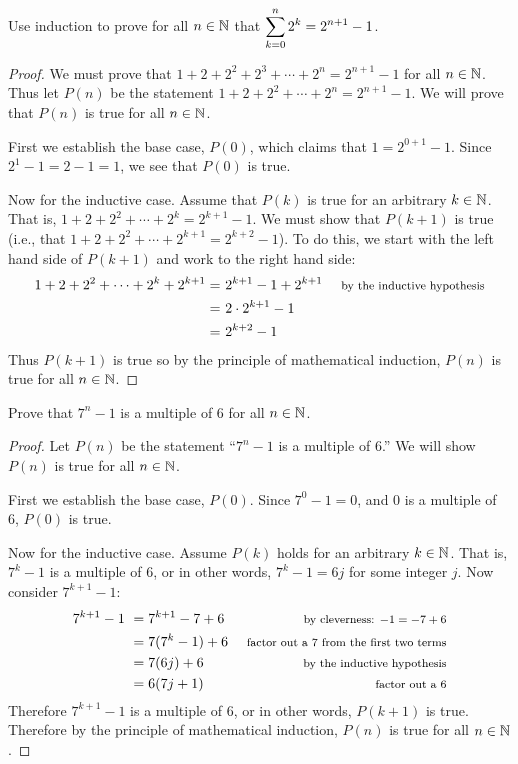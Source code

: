 
\begin{questions}
\question Use induction to prove for all $n \in \mathbb N$ that $\displaystyle\sum_{k=0}^n 2^k = 2^{n+1} - 1$.

	\begin{answer}
		\begin{proof}
		 We must prove that $1 + 2 + 2^2 + 2^3 + \cdots +2^n = 2^{n+1} - 1$ for all $n \in \mathbb N$.  Thus let $P(n)$ be the statement $1 + 2 + 2^2 + \cdots + 2^n = 2^{n+1} - 1$.  We will prove that $P(n)$ is true for all $n \in \mathbb N$.
		 
		 First we establish the base case, $P(0)$, which claims that $1 = 2^{0+1} -1$.  Since $2^1 - 1 = 2 - 1 = 1$, we see that $P(0)$ is true.
		 
		 Now for the inductive case.  Assume that $P(k)$ is true for an arbitrary $k \in \mathbb N$.  That is, $1 + 2 + 2^2 + \cdots + 2^k = 2^{k+1} - 1$.  We must show that $P(k+1)$ is true (i.e., that $1 + 2 + 2^2 + \cdots + 2^{k+1} = 2^{k+2} - 1$).  To do this, we start with the left hand side of $P(k+1)$ and work to the right hand side:
		 \begin{align*}
		  1 + 2 + 2^2 + \cdots + 2^k + 2^{k+1} = &~ 2^{k+1} - 1 + 2^{k+1} & \mbox{ \footnotesize by the inductive hypothesis}\\
		   = & ~2\cdot 2^{k+1} - 1 & \\
		   = &~ 2^{k+2} - 1 &
		 \end{align*}
		Thus $P(k+1)$ is true so by the principle of mathematical induction, $P(n)$ is true for all $n \in \mathbb N$.
		\end{proof}
	\end{answer}
	
	
	
	
\question Prove that $7^n - 1$ is a multiple of 6 for all $n \in \mathbb N$.

	\begin{answer}
		\begin{proof}
		 Let $P(n)$ be the statement ``$7^n - 1$ is a multiple of 6.''  We will show $P(n)$ is true for all $n \in \mathbb N$.  
		 
		 First we establish the base case, $P(0)$.  Since $7^0 - 1 = 0$, and $0$ is a multiple of 6, $P(0)$ is true.
		 
		 Now for the inductive case.  Assume $P(k)$ holds for an arbitrary $k \in \mathbb N$.  That is, $7^k - 1$ is a multiple of 6, or in other words, $7^k - 1 = 6j$ for some integer $j$.  Now consider $7^{k+1} - 1$:
		 \begin{align*}
		  7^{k+1} - 1 ~ & = 7^{k+1} - 7 + 6 & \mbox{ \footnotesize by cleverness: $-1 = -7 + 6$}\\
		  & = 7(7^k - 1) + 6 & \mbox{ \footnotesize factor out a 7 from the first two terms}\\
		  & = 7(6j) + 6 & \mbox{ \footnotesize by the inductive hypothesis}\\
		  & = 6(7j + 1) & \mbox{ \footnotesize factor out a 6}
		 \end{align*}
		Therefore $7^{k+1} - 1$ is a multiple of 6, or in other words, $P(k+1)$ is true.  Therefore by the principle of mathematical induction, $P(n)$ is true for all $n \in \mathbb N$.
		\end{proof}
	\end{answer}
	

\end{questions}
